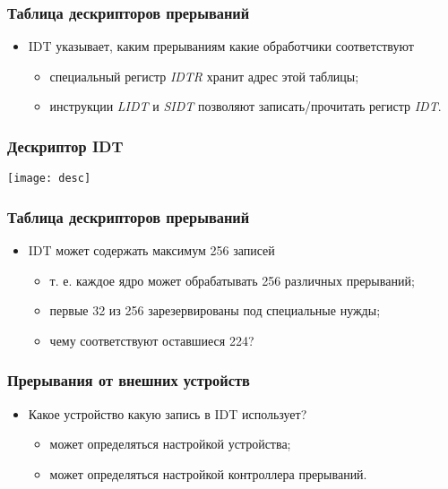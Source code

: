 \begin{frame}
\frametitle{Таблица дескрипторов прерываний}
\begin{itemize}
    \item<1-> IDT указывает, каким прерываниям какие обработчики соответствуют
    \begin{itemize}
        \item<2-> специальный регистр \emph{IDTR} хранит адрес этой таблицы;
        \item<3-> инструкции \emph{LIDT} и \emph{SIDT} позволяют
        записать/прочитать регистр \emph{IDT}.
    \end{itemize}
\end{itemize}
\end{frame}

\begin{frame}
\frametitle{Дескриптор IDT}
    \hspace*{\fill}
    \texttt{[image: desc]}
    \hspace*{\fill}\hspace*{\fill}
\end{frame}

\begin{frame}
\frametitle{Таблица дескрипторов прерываний}
\begin{itemize}
    \item<1->IDT может содержать максимум 256 записей
    \begin{itemize}
        \item т. е. каждое ядро может обрабатывать 256 различных прерываний;
        \item<2-> первые 32 из 256 зарезервированы под специальные нужды;
        \item<3-> чему соответствуют оставшиеся 224?
    \end{itemize}
\end{itemize}
\end{frame}

\begin{frame}
\frametitle{Прерывания от внешних устройств}
\begin{itemize}
    \item<1->Какое устройство какую запись в IDT использует?
    \begin{itemize}
        \item<2->может определяться настройкой устройства;
        \item<3->может определяться настройкой контроллера прерываний.
    \end{itemize}
\end{itemize}
\end{frame}

